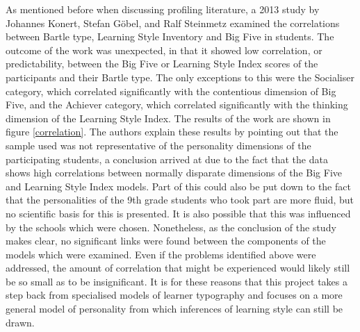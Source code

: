 \documentclass[12pt,a4paper,twoside]{report}
\begin{document}
As mentioned before when discussing profiling literature, a 2013 study by Johannes Konert, Stefan G{\"o}bel, and Ralf Steinmetz \cite{konertmodeling} examined the correlations between Bartle type, Learning Style Inventory and Big Five in students. The outcome of the work was unexpected, in that it showed low correlation, or predictability, between the Big Five or Learning Style Index scores of the participants and their Bartle type. The only exceptions to this were the Socialiser category, which correlated significantly with the contentious dimension of Big Five, and the Achiever category, which correlated significantly with the thinking dimension of the Learning Style Index. The results of the work are shown in figure \ref{correlation}. The authors explain these results by pointing out that the sample used was not representative of the personality dimensions of the participating students, a conclusion arrived at due to the fact that the data shows high correlations between normally disparate dimensions of the Big Five and Learning Style Index models. Part of this could also be put down to the fact that the personalities of the 9th grade students who took part are more fluid, but no scientific basis for this is presented. It is also possible that this was influenced by the schools which were chosen. Nonetheless, as the conclusion of the study makes clear, no significant links were found between the components of the models which were examined. Even if the problems identified above were addressed, the amount of correlation that might be experienced would likely still be so small as to be insignificant. It is for these reasons that this project takes a step back from specialised models of learner typography and focuses on a more general model of personality from which inferences of learning style can still be drawn.
\end{document}

